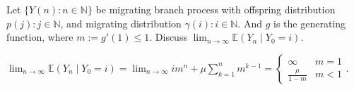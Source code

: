 \documentclass{ctexart}
\begin{document}
\begin{problem}\label{pro:6}
  Let \(\{Y(n): n \in \mathbb{N}\}\) be migrating branch process with offspring distribution \(p(j): j \in \mathbb{N}\),
  and migrating distribution \(\gamma(i):i \in \mathbb{N}\).
  And \(g\) is the generating function, where \(m :=g' (1) \leq 1\).
  Discuss \(\lim_{n \to \infty}\mathbb{E}(Y_n \mid Y_0=i)\).
\end{problem}
\begin{solution}
  \(\lim_{n \to \infty}\mathbb{E}(Y_n \mid Y_0=i)=\lim_{n \to \infty}im^n + \mu \sum_{k=1}^{n} m^{k-1}=\begin{cases}
    \infty          & m=1  \\
    \frac{\mu}{1-m} & m <1
  \end{cases}\).
\end{solution}
\end{document}
